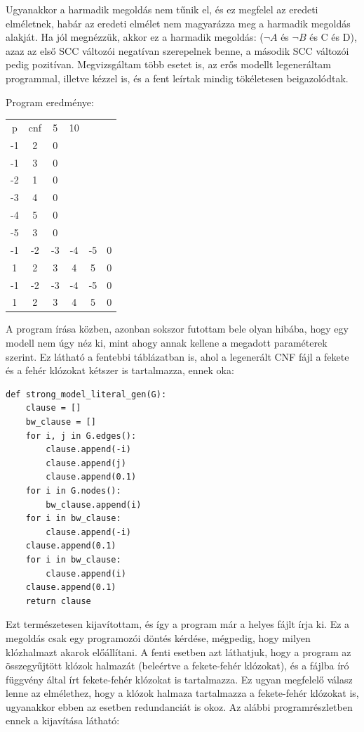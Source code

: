 \documentclass[
]{thesis-ekf}
\theoremstyle{definition}
\theoremstyle{remark}
\begin{document}
	Ugyanakkor a harmadik megoldás nem tűnik el, és ez megfelel az eredeti elméletnek, habár az eredeti elmélet nem magyarázza meg a harmadik megoldás alakját. Ha jól megnézzük, akkor ez a harmadik megoldás: ($ \neg A $ és $ \neg B $ és C és D), azaz az első \textsc{SCC} változói negatívan szerepelnek benne, a második \textsc{SCC} változói pedig pozitívan. Megvizsgáltam több esetet is, az erős modellt legeneráltam programmal, illetve kézzel is, és a fent leírtak mindig tökéletesen beigazolódtak.
	
	Program eredménye:
	
	\begin{tabular}{cccccc}
		p & cnf & 5 & 10 & &   \\
		-1&  2 &  0&   &   &   \\
		-1&  3 &  0&   &   &   \\
		-2&  1 &  0&   &   &   \\
		-3&  4 &  0&   &   &   \\
		-4&  5 &  0&   &   &   \\
		-5&  3 &  0&   &   &   \\
		-1& -2 & -3& -4& -5& 0 \\
		 1&  2 &  3&  4&  5& 0 \\
		-1& -2 & -3& -4& -5& 0 \\
		 1&  2 &  3&  4&  5& 0 \\
	\end{tabular}

	A program írása közben, azonban sokszor futottam bele olyan hibába, hogy egy modell nem úgy néz ki, mint ahogy annak kellene a megadott paraméterek szerint. Ez látható a fentebbi táblázatban is, ahol a  legenerált \textsc{CNF} fájl a fekete és a fehér klózokat kétszer is tartalmazza, ennek oka:
	
	\begin{lstlisting}
def strong_model_literal_gen(G):
	clause = []
	bw_clause = []
	for i, j in G.edges():
		clause.append(-i)
		clause.append(j)
		clause.append(0.1)
	for i in G.nodes():
		bw_clause.append(i)
	for i in bw_clause:
		clause.append(-i)
	clause.append(0.1)
	for i in bw_clause:
	 	clause.append(i)
	clause.append(0.1)
	return clause
	\end{lstlisting}
	
	Ezt természetesen kijavítottam, és így a program már a helyes fájlt írja ki. Ez a megoldás csak egy programozói döntés kérdése, mégpedig, hogy milyen klózhalmazt akarok előállítani. A fenti esetben azt láthatjuk, hogy a program az összegyűjtött klózok halmazát (beleértve a fekete-fehér klózokat), és a fájlba író függvény által írt fekete-fehér klózokat is tartalmazza. Ez ugyan megfelelő válasz lenne az elmélethez, hogy a klózok halmaza tartalmazza a fekete-fehér klózokat is, ugyanakkor ebben az esetben redundanciát is okoz. Az alábbi programrészletben ennek a kijavítása látható:
	
\end{document}
